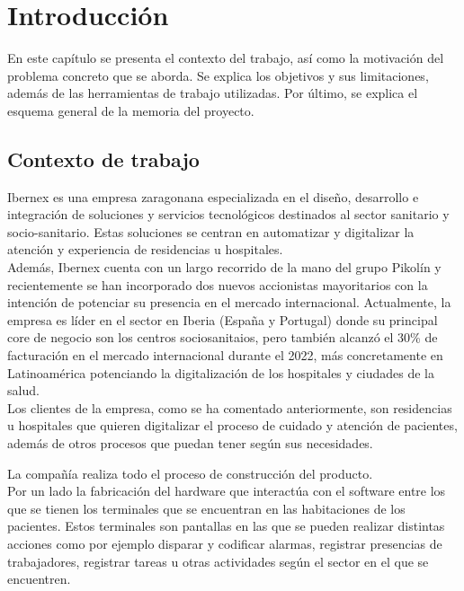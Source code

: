 \chapter{Introducción}
\label{ch:no_lineal}

En este capítulo se presenta el contexto del trabajo, así como la motivación del problema concreto que se aborda. Se explica los objetivos y sus limitaciones, además de las herramientas de trabajo utilizadas. Por último, se explica el esquema general de la memoria del proyecto.

\section{Contexto de trabajo}


 Ibernex es una empresa zaragonana especializada en el diseño, desarrollo e integración de soluciones y servicios tecnológicos destinados al sector sanitario y socio-sanitario. Estas soluciones se centran en automatizar y digitalizar la atención y experiencia de residencias u hospitales.\\

 Además, Ibernex cuenta con un largo recorrido de la mano del grupo Pikolín y recientemente se han incorporado dos nuevos accionistas mayoritarios con la intención de potenciar su presencia en el mercado internacional. Actualmente, la empresa es líder en el sector en Iberia (España y Portugal) donde su principal core de negocio son los centros sociosanitaios, pero también alcanzó el 30\% de facturación en el mercado internacional durante el 2022, más concretamente en Latinoamérica potenciando la digitalización de los hospitales y ciudades de la salud. \\

 Los clientes de la empresa, como se ha comentado anteriormente, son residencias u hospitales que quieren digitalizar el proceso de cuidado y atención de pacientes, además de otros procesos que puedan tener según sus necesidades. \newline



La compañía realiza todo el proceso de construcción del producto. \\

Por un lado la fabricación del hardware que interactúa con el software entre los que se tienen los terminales que se encuentran en las habitaciones de los pacientes. Estos terminales son pantallas en las que se pueden realizar distintas acciones como por ejemplo disparar y codificar alarmas, registrar presencias de trabajadores, registrar tareas u otras actividades según el sector en el que se encuentren.\\
 
